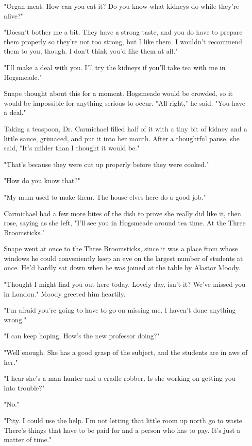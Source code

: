 "Organ meat. How can you eat it? Do you know what kidneys do while they're alive?"

"Doesn't bother me a bit. They have a strong taste, and you do have to prepare them properly so they're not too strong, but I like them. I wouldn't recommend them to you, though. I don't think you'd like them at all."

"I'll make a deal with you. I'll try the kidneys if you'll take tea with me in Hogsmeade."

Snape thought about this for a moment. Hogsmeade would be crowded, so it would be impossible for anything serious to occur. "All right," he said. "You have a deal."

Taking a teaspoon, Dr. Carmichael filled half of it with a tiny bit of kidney and a little sauce, grimaced, and put it into her mouth. After a thoughtful pause, she said, "It's milder than I thought it would be."

"That's because they were cut up properly before they were cooked."

"How do you know that?"

"My mum used to make them. The house-elves here do a good job."

Carmichael had a few more bites of the dish to prove she really did like it, then rose, saying as she left, "I'll see you in Hogsmeade around tea time. At the Three Broomsticks."

Snape went at once to the Three Broomsticks, since it was a place from whose windows he could conveniently keep an eye on the largest number of students at once. He'd hardly sat down when he was joined at the table by Alastor Moody.

"Thought I might find you out here today. Lovely day, isn't it? We've missed you in London." Moody greeted him heartily.

"I'm afraid you're going to have to go on missing me. I haven't done anything wrong."

"I can keep hoping. How's the new professor doing?"

"Well enough. She has a good grasp of the subject, and the students are in awe of her."

"I hear she's a man hunter and a cradle robber. Is she working on getting you into trouble?"

"No."

"Pity. I could use the help. I'm not letting that little room up north go to waste. There's things that have to be paid for and a person who has to pay. It's just a matter of time."

